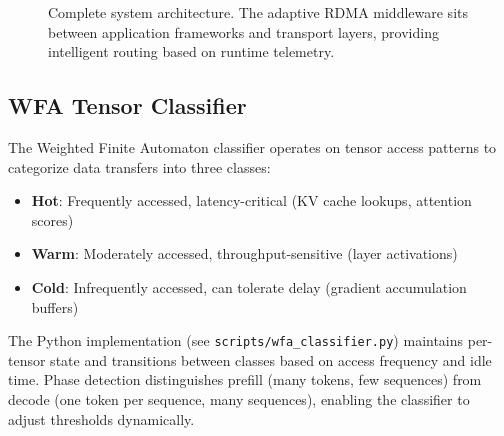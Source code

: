 \documentclass[11pt,letterpaper]{article}
\theoremstyle{definition}
\begin{document}
\begin{figure}[htbp]
{%
}
\caption{Complete system architecture. The adaptive RDMA middleware sits between application frameworks and transport layers, providing intelligent routing based on runtime telemetry.}
\label{fig:system-architecture}
\end{figure}

\subsection{WFA Tensor Classifier}

The Weighted Finite Automaton classifier operates on tensor access patterns to categorize data transfers into three classes:

\begin{itemize}
    \item \textbf{Hot}: Frequently accessed, latency-critical (KV cache lookups, attention scores)
    \item \textbf{Warm}: Moderately accessed, throughput-sensitive (layer activations)
    \item \textbf{Cold}: Infrequently accessed, can tolerate delay (gradient accumulation buffers)
\end{itemize}

The Python implementation (see \texttt{scripts/wfa\_classifier.py}) maintains per-tensor state and transitions between classes based on access frequency and idle time. Phase detection distinguishes prefill (many tokens, few sequences) from decode (one token per sequence, many sequences), enabling the classifier to adjust thresholds dynamically.
\end{document}
